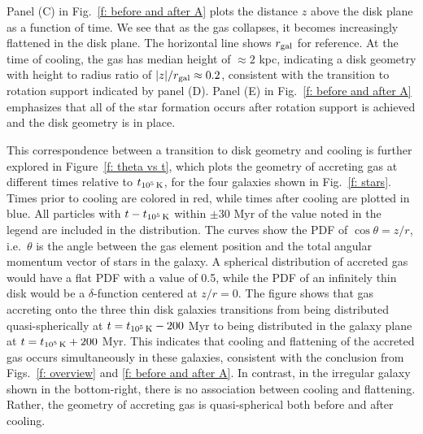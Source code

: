 \documentclass[fleqn,usenatbib]{mnras}
\newcommand{\tcon}{t_{10^5\,{\rm K}}}
\begin{document}
Panel (C) in Fig.~\ref{f: before and after A} plots the distance $z$ above the disk plane as a function of time.
We see that as the gas collapses, it becomes increasingly flattened in the disk plane.
The horizontal line shows $r_{\rm gal}$ for reference.
At the time of cooling, the gas has median height of $\approx 2$ kpc, indicating a disk geometry with height to radius ratio of $\vert z\vert/r_{\rm gal}\approx0.2$, consistent with the transition to rotation support indicated by panel (D).
Panel (E) in Fig.~\ref{f: before and after A} emphasizes that all of the star formation occurs after rotation support is achieved and the disk geometry is in place.

This correspondence between a transition to disk geometry and cooling is further explored in Figure~\ref{f: theta vs t}, which plots the geometry of accreting gas at different times relative to $\tcon$, for the four galaxies shown in Fig.~\ref{f: stars}. 
Times prior to cooling are colored in red, while times after cooling are plotted in blue.
All particles with $t-\tcon$ within $\pm$30 Myr of the value noted in the legend are included in the distribution. 
The curves show the PDF of $\cos \theta = z/r$, i.e.\ $\theta$ is the angle between the gas element position and the total angular momentum vector of stars in the galaxy.
A spherical distribution of accreted gas would have a flat PDF with a value of 0.5, while 
the PDF of an infinitely thin disk would be a $\delta$-function centered at $z/r = 0$.
The figure shows that gas accreting onto the three thin disk galaxies transitions from being distributed quasi-spherically at $t = \tcon-200$ Myr to being distributed in the galaxy plane at $t = \tcon+200$ Myr.
This indicates that cooling and flattening of the accreted gas occurs simultaneously in these galaxies, consistent with the conclusion from Figs.~\ref{f: overview} and \ref{f: before and after A}.
In contrast, in the irregular galaxy shown in the bottom-right, there is no association between cooling and flattening.
Rather, the geometry of accreting gas is quasi-spherical both before and after cooling.

\end{document}

